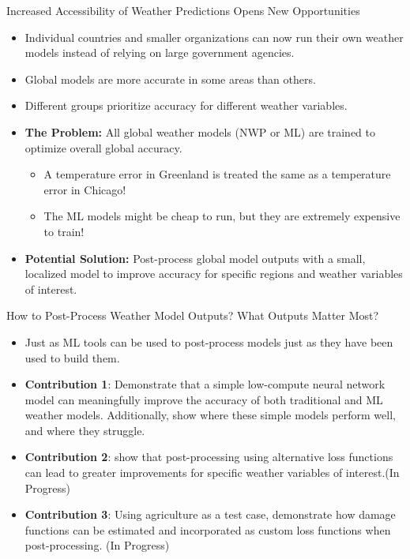 \documentclass[aspectratio=169, xcolor=dvipsnames]{beamer}
\begin{document}
\begin{frame}{Increased Accessibility of Weather Predictions Opens New Opportunities}
    \begin{itemize}
        \item Individual countries and smaller organizations can now run their own weather models instead of relying on large government agencies.
        \item Global models are more accurate in some areas than others.
        \item Different groups prioritize accuracy for different weather variables.
    \end{itemize}
        
    \pause
    \begin{itemize}
        \item \textbf{The Problem:} All global weather models (NWP or ML) are trained to optimize overall global accuracy.
        \begin{itemize}
            \item A temperature error in Greenland is treated the same as a temperature error in Chicago!
            \item The ML models might be cheap to run, but they are extremely expensive to train!
        \end{itemize}
     \item \textbf{Potential Solution:} Post-process global model outputs with a small, localized model to improve accuracy for specific regions and weather variables of interest. 
    \end{itemize}
\end{frame}

\begin{frame}{How to Post-Process Weather Model Outputs? What Outputs Matter Most?}

    \begin{itemize}
        \item Just as ML tools can be used to post-process models just as they have been used to build them. 
        \item \textbf{Contribution 1}: Demonstrate that a simple low-compute neural network model can meaningfully improve the accuracy of both traditional and ML weather models. Additionally, show where these simple models perform well, and where they struggle.
        \item \textbf{Contribution 2}: show that post-processing using alternative loss functions can lead to greater improvements for specific weather variables of interest.(In Progress)
        \item \textbf{Contribution 3}: Using agriculture as a test case, demonstrate how damage functions can be estimated and incorporated as custom loss functions when post-processing. (In Progress)
    \end{itemize}
\end{frame}
\end{document}
